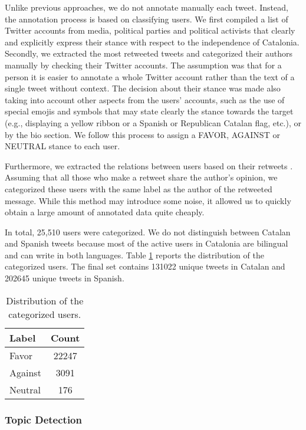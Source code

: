 \documentclass[10pt, a4paper]{article}
\begin{document}
Unlike previous approaches, we do not annotate manually each tweet. Instead, the annotation process is based on classifying users. We first compiled a list of Twitter accounts from media, political parties and political activists that clearly and explicitly express their stance with respect to the independence of Catalonia. Secondly, we extracted the most retweeted tweets and categorized their authors manually by checking their Twitter accounts. The assumption was that for a person it is easier to annotate a whole Twitter account rather than the text of a single tweet without context. The decision about their stance was made also taking into account other aspects from the users' accounts, such as the use of special emojis and symbols that may state clearly the stance towards the target (e.g., displaying a yellow ribbon or a Spanish or Republican Catalan flag, etc.), or by the bio section. We follow this process to assign a FAVOR, AGAINST or NEUTRAL stance to each user.

Furthermore, we extracted the relations between users based on their retweets \cite{SNA2002}. Assuming that all those who make a retweet share the author's opinion, we categorized these users with the same label as the author of the retweeted message. While this method may introduce some noise, it allowed us to quickly obtain a large amount of annotated data quite cheaply.

In total, 25,510 users were categorized. We do not distinguish between Catalan and Spanish tweets because most of the active users in Catalonia are bilingual and can write in both languages. Table \ref{table:users} reports the distribution of the categorized users. The final set contains 131022 unique tweets in Catalan and 202645 unique tweets in Spanish.

\begin{table}[!ht]
\centering
\begin{tabular}{lc} \hline
      Label & Count \\ \hline
      Favor & 22247 \\
      Against & 3091 \\
     Neutral & 176 \\ \hline
\end{tabular}
\caption{Distribution of the categorized users.}\label{table:users}
\end{table}

\subsubsection{Topic Detection}\label{sec:topic-detection}
\end{document}
